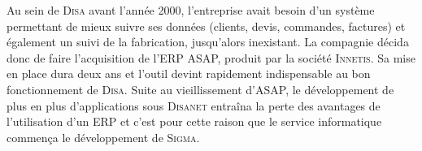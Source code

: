 Au sein de \textsc{Disa} avant l'année 2000, l'entreprise avait besoin d'un système permettant de mieux suivre ses données (clients, devis, commandes, factures) et également un suivi de la fabrication, jusqu'alors inexistant.
La compagnie décida donc de faire l'acquisition de l'ERP ASAP, produit par la société \textsc{Innetis}.
Sa mise en place dura deux ans et l'outil devint rapidement indispensable au bon fonctionnement de \textsc{Disa}.
Suite au vieillissement d'ASAP, le développement de plus en plus d'applications sous \textsc{Disanet} entraîna la perte des avantages de l'utilisation d'un ERP et c'est pour cette raison que le service informatique commença le développement de \textsc{Sigma}.
